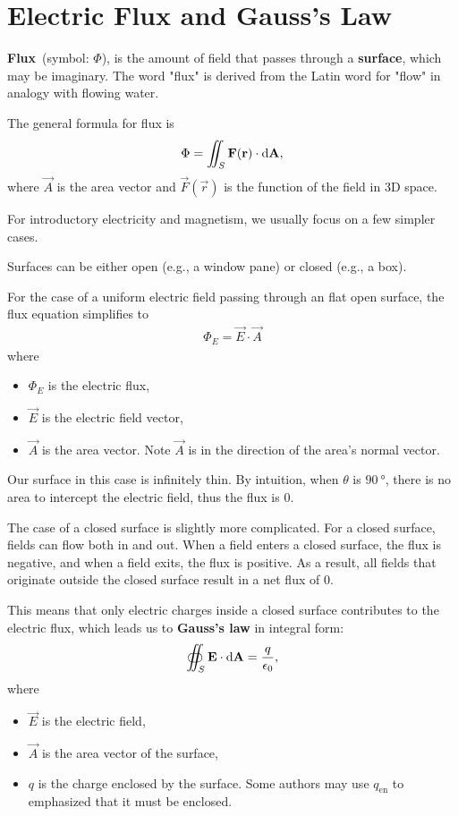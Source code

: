 \section{Electric Flux and Gauss's Law}

\textbf{Flux}~(symbol: \(\Phi\)),
is the amount of field that passes through a \textbf{surface},
which may be imaginary.
The word "flux" is derived from the Latin word for "flow"
in analogy with flowing water.

The general formula for flux is
\begin{equation}
    \Phi = \iint_S \vec{F}(\vec{r}) \cdot \odif{\vec{A}},
\end{equation}
where \(\vec{A}\) is the area vector
and \(\vec{F}(\vec{r})\) is the function of the field in 3D space.

For introductory electricity and magnetism,
we usually focus on a few simpler cases.

Surfaces can be either open (e.g., a window pane) or closed (e.g., a box).

For the case of a uniform electric field passing through an flat open surface,
the flux equation simplifies to
\begin{equation}
    \begin{aligned}
        \Phi_E = \vec{E} \cdot \vec{A}
    \end{aligned}
\end{equation}
where
\begin{itemize}
    \item \(\Phi_E\) is the electric flux,
    \item \(\vec{E}\) is the electric field vector,
    \item \(\vec{A}\) is the area vector.
        Note \(\vec{A}\) is in the direction of the area's normal vector.
\end{itemize}
Our surface in this case is infinitely thin.
By intuition, when \(\theta\) is \(\qty{90}{\degree}\),
there is no area to intercept the electric field,
thus the flux is 0.

The case of a closed surface is slightly more complicated.
For a closed surface, fields can flow both in and out.
When a field enters a closed surface, the flux is negative,
and when a field exits, the flux is positive.
As a result,
all fields that originate outside the closed surface result in a net flux of 0.

This means that only electric charges inside a closed surface
contributes to the electric flux,
which leads us to \textbf{Gauss's law} in integral form:
\begin{equation} \label{eq:gausss-law}
    \oiint_S \vec{E} \cdot \odif{\vec{A}} = \frac{q}{\epsilon_0},
\end{equation}
where
\begin{itemize}
    \item \(\vec{E}\) is the electric field,
    \item \(\vec{A}\) is the area vector of the surface,
    \item \(q\) is the charge enclosed by the surface.
        Some authors may use \(q_\mathrm{en}\)
        to emphasized that it must be enclosed.
\end{itemize}

